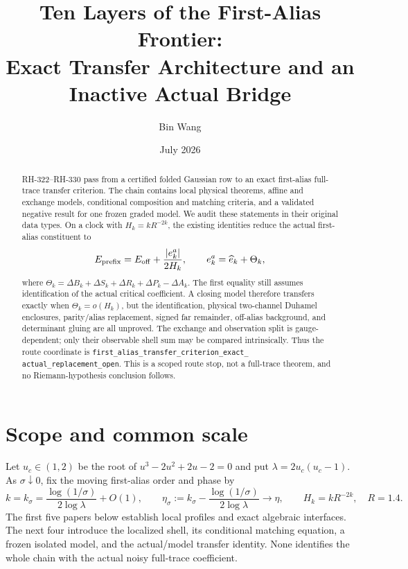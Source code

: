 \documentclass[11pt]{article}
\title{Ten Layers of the First-Alias Frontier:\\Exact Transfer Architecture and an Inactive Actual Bridge}
\author{Bin Wang}\date{July 2026}
\theoremstyle{remark}\newtheorem{remark}[theorem]{Remark}
\newcommand{\Hk}{H_k}
\begin{document}
\maketitle

\begin{abstract}
RH-322--RH-330 pass from a certified folded Gaussian row to an exact
first-alias full-trace transfer criterion.  The chain contains local physical
theorems, affine and exchange models, conditional composition and matching
criteria, and a validated negative result for one frozen graded model.  We
audit these statements in their original data types.  On a clock with
$\Hk=kR^{-2k}$, the existing identities reduce the actual first-alias
constituent to
\[
 E_{\rm prefix}=E_{\rm off}+\frac{|e_k^a|}{2\Hk},\qquad
 e_k^a=\widehat e_k+\Theta_k,
\]
where
$\Theta_k=\Delta B_k+\Delta S_k+\Delta R_k+\Delta P_k-\Delta A_k$.
The first equality still assumes identification of the actual critical
coefficient.  A closing model therefore transfers exactly when
$\Theta_k=o(\Hk)$, but the identification, physical two-channel Duhamel
enclosures, parity/alias replacement, signed far remainder, off-alias
background, and determinant gluing are all unproved.  The exchange and
observation split is gauge-dependent; only their observable shell sum may be
compared intrinsically.  Thus the route coordinate is
\texttt{first\_alias\_transfer\_criterion\_exact\_}\allowbreak
\texttt{actual\_replacement\_open}.
This is a scoped route stop, not a full-trace theorem, and no
Riemann-hypothesis conclusion follows.
\end{abstract}

\section{Scope and common scale}
Let $u_c\in(1,2)$ be the root of
$u^3-2u^2+2u-2=0$ and put $\lambda=2u_c(u_c-1)$.  As
$\sigma\downarrow0$, fix the moving first-alias order and phase by
\[
 k=k_\sigma=\frac{\log(1/\sigma)}{2\log\lambda}+O(1),
 \qquad
 \eta_\sigma:=k_\sigma-\frac{\log(1/\sigma)}{2\log\lambda}
 \longrightarrow\eta,
 \qquad \Hk=kR^{-2k},\quad R=1.4.
\]
The first five papers below establish local profiles and exact algebraic
interfaces.  The next four introduce the localized shell, its conditional
matching equation, a frozen isolated model, and the actual/model transfer
identity.  None identifies the whole chain with the actual noisy
full-trace coefficient.
\end{document}
